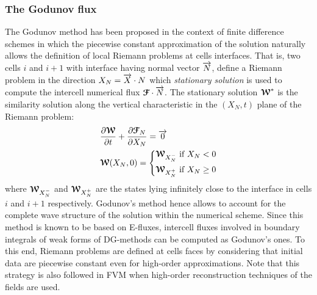 \subsubsection*{The Godunov flux}
The Godunov method \cite{Godunov_method} has been proposed in the context of finite difference schemes in which the piecewise constant approximation of the solution naturally allows the definition of local Riemann problems at cells interfaces. That is, two cells $i$ and $i+1$ with interface having normal vector ${\overrightarrow{N}}$, define a Riemann problem in the direction $X_N={\overrightarrow{X}}\cdot{N}$ which \textit{stationary solution} is used to compute the intercell numerical flux ${\boldsymbol{\mathcal{F}}} \cdot {\overrightarrow{N}}$. The stationary solution ${\boldsymbol{\mathcal{W}}}^*$ is the similarity solution along the vertical characteristic in the $(X_N,t)$ plane of the Riemann problem:
\begin{equation}
  \label{eq:RP_mesh}
  \begin{aligned}
    &\frac{\partial {\boldsymbol{\mathcal{W}}}}{\partial t} + \frac{\partial {\boldsymbol{\mathcal{F}}}_N}{\partial X_N} = {\overrightarrow{0}}  \\
    & {\boldsymbol{\mathcal{W}}}(X_N,0)= \left\lbrace 
      \begin{aligned}
        & {\boldsymbol{\mathcal{W}}}_{X_N^-} \text{ if } X_N <0 \\
        & {\boldsymbol{\mathcal{W}}}_{X_N^{+}} \text{ if } X_N \geq 0
      \end{aligned}
        \right.
  \end{aligned}
\end{equation}
where ${\boldsymbol{\mathcal{W}}}_{X_N^-}$ and ${\boldsymbol{\mathcal{W}}}_{X_N^{+}}$ are the states lying infinitely close to the interface in cells $i$ and $i+1$ respectively. 
Godunov's method hence allows to account for the complete wave structure of the solution within the numerical scheme. Since this method is known to be based on E-fluxes, intercell fluxes involved in boundary integrals of weak forms of DG-methods can be computed as Godunov's ones. To this end, Riemann problems are defined at cells faces by considering that initial data are piecewise constant even for high-order approximations. Note that this strategy is also followed in FVM when high-order reconstruction techniques of the fields are used.


